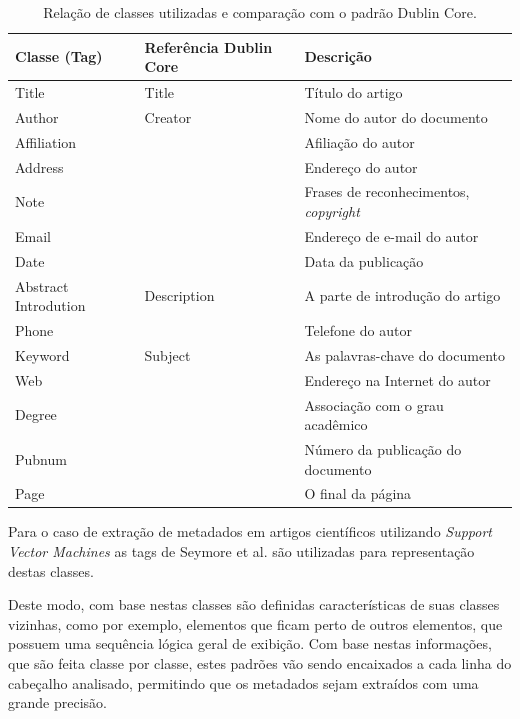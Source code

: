 \begin{table}
    \caption{Relação de classes utilizadas e comparação com o padrão Dublin Core.}
    \begin{center}
        \begin{tabular}{|C{3cm}|C{3cm}|p{7cm}|}
            \hline \textbf{Classe (Tag)} & \textbf{Referência Dublin Core} & \textbf{Descrição}\\ 
            \hline Title & Title & Título do artigo\\
            \hline Author & Creator & Nome do autor do documento\\
            \hline Affiliation & & Afiliação do autor\\
            \hline Address & & Endereço do autor\\
            \hline Note & & Frases de reconhecimentos, \textit{copyright}\\
            \hline Email & & Endereço de e-mail do autor\\
            \hline Date & & Data da publicação\\
            \hline Abstract Introdution & Description & A parte de introdução do artigo\\
            \hline Phone & & Telefone do autor\\
            \hline Keyword & Subject & As palavras-chave do documento\\
            \hline Web & & Endereço na Internet do autor\\
            \hline Degree & & Associação com o grau acadêmico\\
            \hline Pubnum & & Número da publicação do documento\\
            \hline Page & & O final da página\\
            \hline
        \end{tabular}
    \end{center}
    \label{tab:svm-classes}
\end{table}

Para o caso de extração de metadados em artigos científicos utilizando \textit{Support Vector Machines} \cite{svm} as tags de Seymore et al. \cite{seymore} são utilizadas para representação destas classes.

Deste modo, com base nestas classes são definidas características de suas classes vizinhas, como por exemplo, elementos que ficam perto de outros elementos, que possuem uma sequência lógica geral de exibição. Com base nestas informações, que são feita classe por classe, estes padrões vão sendo encaixados a cada linha do cabeçalho analisado, permitindo que os metadados sejam extraídos com uma grande precisão.

